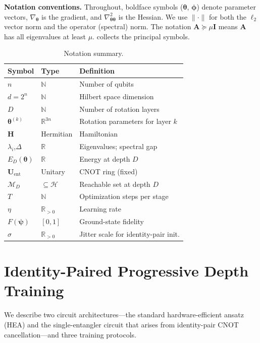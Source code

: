 \documentclass[11pt]{article}
\newcommand{\cM}{\mathcal{M}}
\newcommand{\cH}{\mathcal{H}}
\newcommand{\bbR}{\mathbb{R}}
\theoremstyle{plain}
\theoremstyle{plain}
\newcommand{\bbN}{\mathbb{N}}
\begin{document}
\medskip\noindent\textbf{Notation conventions.}
Throughout, boldface symbols ($\bm\theta$, $\bm\phi$) denote
parameter vectors, $\nabla_{\bm\theta}$ is the gradient, and
$\nabla^2_{\bm\theta\bm\theta}$ is the Hessian.  We use $\|\cdot\|$
for both the $\ell_2$ vector norm and the operator (spectral) norm.
The notation $\mathbf{A}\succeq\mu \mathbf{I}$ means $\mathbf{A}$ has all eigenvalues at least
$\mu$.   collects the principal symbols.
\begin{table}[t]
\centering\small
\caption{Notation summary.}\label{tab:notation}
\begin{tabular}{@{}lll@{}}
\toprule
\textbf{Symbol} & \textbf{Type} & \textbf{Definition} \\
\midrule
$n$               & $\bbN$       & Number of qubits \\
$d=2^n$           & $\bbN$       & Hilbert space dimension \\
$D$               & $\bbN$       & Number of rotation layers \\
$\bm\theta^{(k)}$ & $\bbR^{3n}$ & Rotation parameters for layer $k$ \\
$\mathbf{H}$               & Hermitian    & Hamiltonian \\
$\lambda_i$,$\Delta$ & $\bbR$    & Eigenvalues; spectral gap \\
$E_D(\bm\theta)$  & $\bbR$      & Energy at depth $D$ \\
$\mathbf{U}_{\mathrm{ent}}$ & Unitary     & CNOT ring (fixed) \\
$\cM_D$           & $\subseteq\cH$ & Reachable set at depth $D$ \\
$T$               & $\bbN$       & Optimization steps per stage \\
$\eta$            & $\bbR_{>0}$  & Learning rate \\
$F(\boldsymbol{\psi})$         & $[0,1]$      & Ground-state fidelity \\
$\sigma$          & $\bbR_{>0}$  & Jitter scale for identity-pair init. \\
\bottomrule
\end{tabular}
\end{table}
\section{Identity-Paired Progressive Depth Training}\label{sec:method}
We describe two circuit architectures---the standard hardware-efficient
ansatz (HEA) and the single-entangler circuit that arises from
identity-pair CNOT cancellation---and three training protocols.
\end{document}
